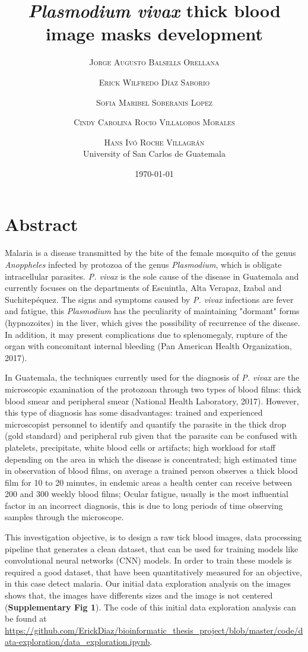 \documentclass{article}
\title{\textit{Plasmodium vivax} thick blood image masks development} %
\author{%
\textsc{Jorge Augusto Balsells Orellana} \\[1ex] %
\and
\textsc{Erick Wilfredo D\'{i}az Saborio} \\[1ex] %
\and 
\textsc{Sofia Maribel Soberanis Lopez} \\[1ex] %
\and 
\textsc{Cindy Carolina Rocio Villalobos Morales} \\[1ex] %
\and 
\textsc{Hans Iv\'{o} Roche Villagr\'{a}n} \\[1ex] %
\normalsize University of San Carlos de Guatemala \\ %
}
\date{\today} %
\begin{document}
\maketitle


\section{Abstract}

Malaria is a disease transmitted by the bite of the female mosquito of the genus \textit{Anoppheles} infected by protozoa of the genus \textit{Plasmodium}, which is obligate intracellular parasites. \textit{P. vivax} is the sole cause of the disease in Guatemala and currently focuses on the departments of Escuintla, Alta Verapaz, Izabal and Suchitepéquez. The signs and symptoms caused by \textit{P. vivax} infections are fever and fatigue, this \textit{Plasmodium} has the peculiarity of maintaining "dormant" forms (hypnozoites) in the liver, which gives the possibility of recurrence of the disease. In addition, it may present complications due to splenomegaly, rupture of the organ with concomitant internal bleeding (Pan American Health Organization, 2017).

In Guatemala, the techniques currently used for the diagnosis of \textit{P. vivax} are the microscopic examination of the protozoan through two types of blood films: thick blood smear and peripheral smear (National Health Laboratory, 2017). However, this type of diagnosis has some disadvantages: trained and experienced microscopist personnel to identify and quantify the parasite in the thick drop (gold standard) and peripheral rub given that the parasite can be confused with platelets, precipitate, white blood cells or artifacts; high workload for staff depending on the area in which the disease is concentrated; high estimated time in observation of blood films, on average a trained person observes a thick blood film for 10 to 20 minutes, in endemic areas a health center can receive between 200 and 300 weekly blood films; Ocular fatigue, usually is the most influential factor in an incorrect diagnosis, this is due to long periods of time observing samples through the microscope.

This investigation objective, is to design a raw tick blood images, data processing pipeline that generates a clean dataset, that can be used for training models like convolutional neural networks (CNN) models. In order to train these models is required a good dataset, that have been quantitatively measured for an objective, in this case detect malaria. Our initial data exploration analysis on the images shows that, the images have differents sizes and the image is not centered (\textbf{Supplementary Fig 1}). The code of this initial data exploration analysis can be found at \url{https://github.com/ErickDiaz/bioinformatic_thesis_project/blob/master/code/data-exploration/data_exploration.ipynb}.
\end{document}

